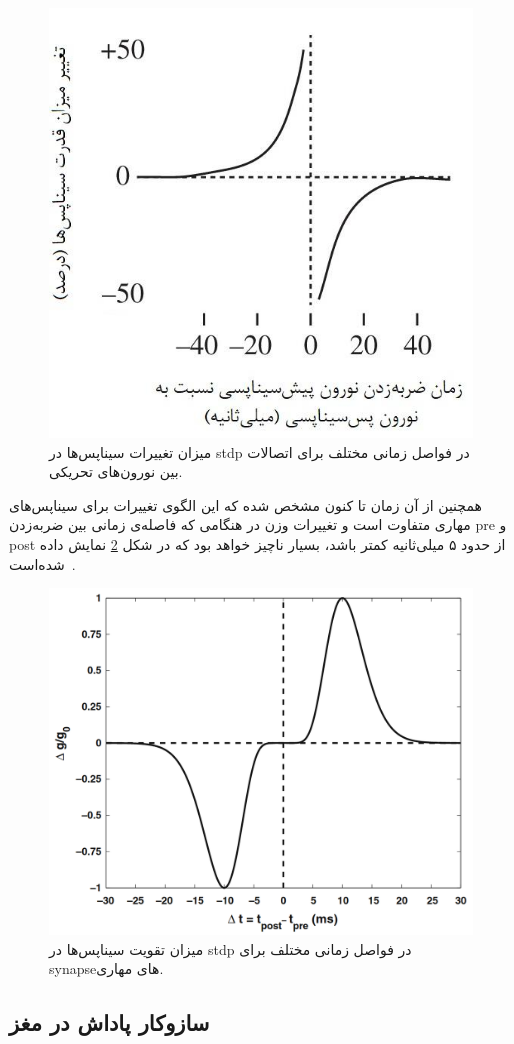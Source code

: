 \documentclass[12pt]{report}
\begin{document}
\begin{figure}[H]
	\centering
	\includegraphics[width=0.6\linewidth]{stdp.jpg}
	\caption[NS]{
		میزان تغییرات سیناپس‌ها در \gls{stdp} در فواصل زمانی مختلف برای اتصالات بین نورون‌های تحریکی.
	}
	\label{fig:stdp}
\end{figure}

همچنین از آن زمان تا کنون مشخص شده که این الگوی تغییرات برای سیناپس‌های مهاری متفاوت است و تغییرات وزن در هنگامی که فاصله‌ی زمانی بین ضربه‌زدن \gls{pre} و \gls{post} از حدود ۵ میلی‌ثانیه کمتر باشد، بسیار ناچیز خواهد بود که در شکل \ref{fig:stdp-inh} نمایش داده شده‌است~\cite{Haas2006}.

\begin{figure}[H]
	\centering
	\includegraphics[width=0.7\linewidth]{stdp-inh.png}
	\caption[NS]{
		میزان تقویت سیناپس‌ها در \gls{stdp} در فواصل زمانی مختلف برای \gls{synapse}‌های مهاری.
	}
	\label{fig:stdp-inh}
\end{figure}

\subsection{سازوکار پاداش در مغز}
\label{section:reward-in-brain}
\end{document}
